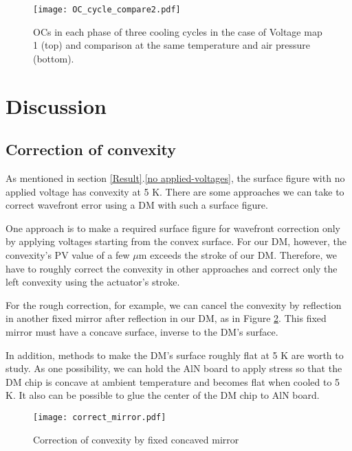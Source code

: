 \documentclass[a4paper]{article}
\begin{document}
\begin{figure}[htbp]
\centering
\texttt{[image: OC\_cycle\_compare2.pdf]}
\caption{OCs in each phase of three cooling cycles in the case of Voltage map 1 (top) and comparison at the same temperature and air pressure (bottom).}
\label{vm1_OC_cycle_compare}
\end{figure}

\clearpage
\section{Discussion}

\subsection{Correction of convexity}
As mentioned in section \ref{Result}.\ref{no applied-voltages}, the surface figure with no applied voltage has convexity at 5 K. There are some approaches we can take to correct wavefront error using a DM with such a surface figure.

One approach is to make a required surface figure for wavefront correction only by applying voltages starting from the convex surface. For our DM, however, the convexity's PV value of a few $\mu$m exceeds the stroke of our DM. Therefore, we have to roughly correct the convexity in other approaches and correct only the left convexity using the actuator's stroke.

For the rough correction, for example, we can cancel the convexity by reflection in another fixed mirror after reflection in our DM, as in Figure \ref{correct_mirror}. This fixed mirror must have a concave surface, inverse to the DM's surface.

In addition, methods to make the DM's surface roughly flat at 5 K are worth to study. As one possibility, we can hold the AlN board to apply stress so that the DM chip is concave at ambient temperature and becomes flat when cooled to 5 K. It also can be possible to glue the center of the DM chip to AlN board.

\begin{figure}[htbp]
\centering
\texttt{[image: correct\_mirror.pdf]}
\caption{Correction of convexity by fixed concaved mirror}
\label{correct_mirror}
\end{figure}
\end{document}
